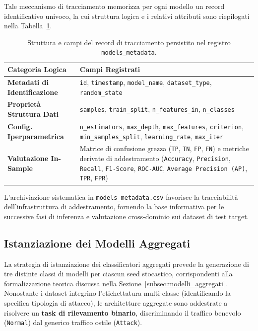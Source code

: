 Tale meccanismo di tracciamento memorizza per ogni modello un record identificativo univoco, la cui struttura logica e i relativi attributi sono riepilogati nella Tabella~\ref{tab:models_metadata_schema}.

\begin{table}[H]
    \centering
    \small
    \caption{Struttura e campi del record di tracciamento persistito nel registro \texttt{models\_metadata}.}
    \label{tab:models_metadata_schema}
    \begin{tabularx}{\textwidth}{>{\raggedright\arraybackslash}p{5cm} >{\raggedright\arraybackslash}X}
        \toprule
        \textbf{Categoria Logica} & \textbf{Campi Registrati} \\
        \midrule
        \textbf{Metadati di Identificazione} & 
        \texttt{id}, \texttt{timestamp}, \texttt{model\_name}, \texttt{dataset\_type}, \texttt{random\_state} \\
        \textbf{Proprietà Struttura Dati} & 
        \texttt{samples}, \texttt{train\_split}, \texttt{n\_features\_in}, \texttt{n\_classes} \\
        \textbf{Config. Iperparametrica} & 
        \texttt{n\_estimators}, \texttt{max\_depth}, \texttt{max\_features}, \texttt{criterion}, \texttt{min\_samples\_split}, \texttt{learning\_rate}, \texttt{max\_iter} \\
        \textbf{Valutazione In-Sample} & 
        Matrice di confusione grezza (\texttt{TP}, \texttt{TN}, \texttt{FP}, \texttt{FN}) e metriche derivate di addestramento (\texttt{Accuracy}, \texttt{Precision}, \texttt{Recall}, \texttt{F1-Score}, \texttt{ROC-AUC}, \texttt{Average Precision (AP)}, \texttt{TPR}, \texttt{FPR}) \\
        \bottomrule
    \end{tabularx}
\end{table}

L'archiviazione sistematica in \texttt{models\_metadata.csv} favorisce la tracciabilità dell'infrastruttura di addestramento, fornendo la base informativa per le successive fasi di inferenza e valutazione cross-dominio sui dataset di test target.

\subsection{Istanziazione dei Modelli Aggregati}
\label{subsec:istanziazione_aggregati}

La strategia di istanziazione dei classificatori aggregati prevede la generazione di tre distinte classi di modelli per ciascun seed stocastico, corrispondenti alla formalizzazione teorica discussa nella Sezione~\ref{subsec:modelli_aggregati}. 
Nonostante i dataset integrino l'etichettatura multi-classe (identificando la specifica tipologia di attacco), le architetture aggregate sono addestrate a risolvere un \textbf{task di rilevamento binario}, discriminando il traffico benevolo (\texttt{Normal}) dal generico traffico ostile (\texttt{Attack}).

